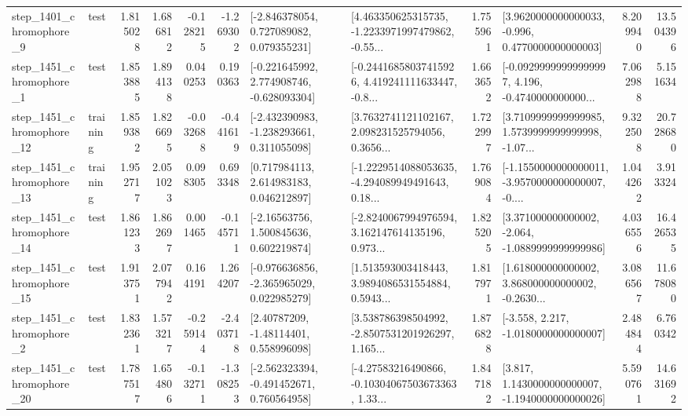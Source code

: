 \begin{tabular}{llrrrrllrlrr}
  step\_1401\_chromophore\_9 &      test &      1.815028 &    1.686812 &     -0.128215 & -1.269302 &    [-2.846378054, 0.727089082, 0.079355231] &  [4.463350625315735, -1.2233971997479862, -0.55... &       1.755961 &   [3.9620000000000033, -0.996, 0.4770000000000003] &            8.209940 &         13.504396 \\
  step\_1451\_chromophore\_1 &      test &      1.853885 &    1.894138 &      0.040253 &  0.190363 &   [-0.221645992, 2.774908746, -0.628093304] &  [-0.24416858037415926, 4.419241111633447, -0.8... &       1.663652 &  [-0.09299999999999997, 4.196, -0.4740000000000... &            7.062988 &          5.151634 \\
 step\_1451\_chromophore\_12 &  training &      1.859382 &    1.826695 &     -0.032688 & -0.441619 &   [-2.432390983, -1.238293661, 0.311055098] &  [3.7632741121102167, 2.098231525794056, 0.3656... &       1.722997 &  [3.7109999999999985, 1.5739999999999998, -1.07... &            9.322508 &         20.728680 \\
 step\_1451\_chromophore\_13 &  training &      1.952717 &    2.051023 &      0.098305 &  0.693348 &     [0.717984113, 2.614983183, 0.046212897] &  [-1.2229514088053635, -4.294089949491643, 0.18... &       1.769084 &  [-1.1550000000000011, -3.9570000000000007, -0.... &            1.044262 &          3.913324 \\
 step\_1451\_chromophore\_14 &      test &      1.861233 &    1.862697 &      0.001465 & -0.145711 &     [-2.16563756, 1.500845636, 0.602219874] &  [-2.8240067994976594, 3.162147614135196, 0.973... &       1.825205 &   [3.371000000000002, -2.064, -1.0889999999999986] &            4.036556 &         16.426535 \\
 step\_1451\_chromophore\_15 &      test &      1.913751 &    2.077942 &      0.164191 &  1.264207 &   [-0.976636856, -2.365965029, 0.022985279] &  [1.513593003418443, 3.9894086531554884, 0.5943... &       1.817971 &  [1.618000000000002, 3.868000000000002, -0.2630... &            3.086567 &         11.678080 \\
  step\_1451\_chromophore\_2 &      test &      1.832361 &    1.573217 &     -0.259144 & -2.403718 &      [2.40787209, -1.48114401, 0.558996098] &  [3.538786398504992, -2.8507531201926297, 1.165... &       1.876828 &               [-3.558, 2.217, -1.0180000000000007] &            2.484844 &          6.760342 \\
 step\_1451\_chromophore\_20 &      test &      1.787517 &    1.654806 &     -0.132711 & -1.308253 &   [-2.562323394, -0.491452671, 0.760564958] &  [-4.27583216490866, -0.10304067503673363, 1.33... &       1.847182 &   [3.817, 1.1430000000000007, -1.1940000000000026] &            5.590761 &         14.631692 \\

\end{tabular}
